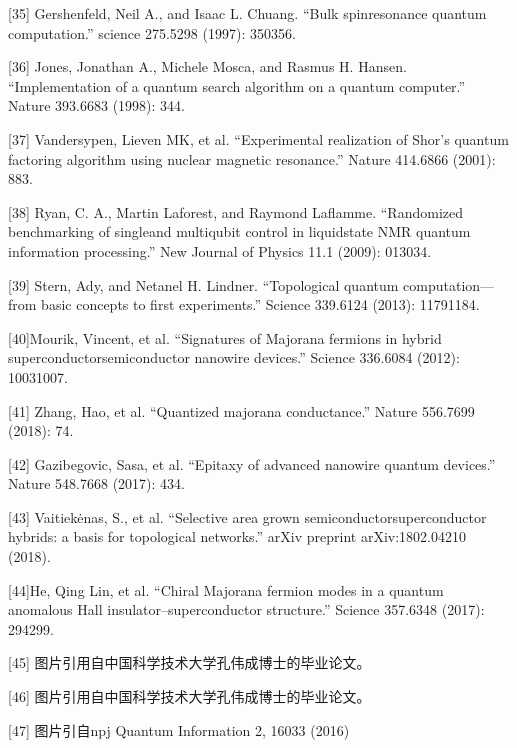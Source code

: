 \documentclass[a4paper,11pt,english]{sphinxmanual}
\begin{document}
\sphinxAtStartPar
{[}35{]} Gershenfeld, Neil A., and Isaac L. Chuang. “Bulk spin\sphinxhyphen{}resonance quantum computation.” science 275.5298 (1997): 350\sphinxhyphen{}356.

\sphinxAtStartPar
{[}36{]} Jones, Jonathan A., Michele Mosca, and Rasmus H. Hansen. “Implementation of a quantum search algorithm on a quantum computer.” Nature 393.6683 (1998): 344.

\sphinxAtStartPar
{[}37{]} Vandersypen, Lieven MK, et al. “Experimental realization of Shor’s quantum factoring algorithm using nuclear magnetic resonance.” Nature 414.6866 (2001): 883.

\sphinxAtStartPar
{[}38{]} Ryan, C. A., Martin Laforest, and Raymond Laflamme. “Randomized benchmarking of single\sphinxhyphen{}and multi\sphinxhyphen{}qubit control in liquid\sphinxhyphen{}state NMR quantum information processing.” New Journal of Physics 11.1 (2009): 013034.

\sphinxAtStartPar
{[}39{]} Stern, Ady, and Netanel H. Lindner. “Topological quantum computation—from basic concepts to first experiments.” Science 339.6124 (2013): 1179\sphinxhyphen{}1184.

\sphinxAtStartPar
{[}40{]}Mourik, Vincent, et al. “Signatures of Majorana fermions in hybrid superconductor\sphinxhyphen{}semiconductor nanowire devices.” Science 336.6084 (2012): 1003\sphinxhyphen{}1007.

\sphinxAtStartPar
{[}41{]} Zhang, Hao, et al. “Quantized majorana conductance.” Nature 556.7699 (2018): 74.

\sphinxAtStartPar
{[}42{]} Gazibegovic, Sasa, et al. “Epitaxy of advanced nanowire quantum devices.” Nature 548.7668 (2017): 434.

\sphinxAtStartPar
{[}43{]} Vaitiekėnas, S., et al. “Selective area grown semiconductor\sphinxhyphen{}superconductor hybrids: a basis for topological networks.” arXiv preprint arXiv:1802.04210 (2018).

\sphinxAtStartPar
{[}44{]}He, Qing Lin, et al. “Chiral Majorana fermion modes in a quantum anomalous Hall insulator–superconductor structure.” Science 357.6348 (2017): 294\sphinxhyphen{}299.

\sphinxAtStartPar
{[}45{]} 图片引用自中国科学技术大学孔伟成博士的毕业论文。

\sphinxAtStartPar
{[}46{]} 图片引用自中国科学技术大学孔伟成博士的毕业论文。

\sphinxAtStartPar
{[}47{]} 图片引自npj Quantum Information 2, 16033 (2016)
\end{document}
